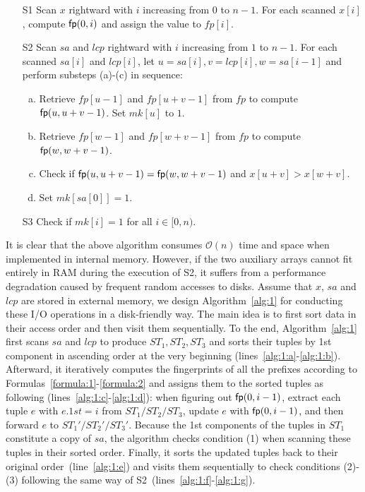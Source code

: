 \documentclass[10pt,journal,compsoc]{IEEEtran}
\begin{document}
\begin{enumerate}
	\item [S1]
	Scan $x$ rightward with $i$ increasing from $0$ to $n - 1$. For each scanned $x[i]$, compute ${\sf fp}(0, i)$ and assign the value to $fp[i]$.
	
	\item [S2]
	Scan $sa$ and $lcp$ rightward with $i$ increasing from $1$ to $n - 1$. For each scanned $sa[i]$ and $lcp[i]$, let $u = sa[i], v = lcp[i], w = sa[i - 1]$ and perform substeps (a)-(c) in sequence:
	
	\begin{enumerate}[(a)]
		\item
		Retrieve $fp[u - 1]$ and $fp[u + v - 1]$ from $fp$ to compute ${\sf fp}(u, u + v - 1)$. Set $mk[u]$ to $1$.
		
		\item
		Retrieve $fp[w - 1]$ and $fp[w + v - 1]$ from $fp$ to compute ${\sf fp}(w, w + v - 1)$.
		
		\item
		Check if ${\sf fp}(u, u + v - 1) = {\sf fp}(w, w + v - 1)$ and $x[u + v] > x[w + v]$.
		
		\item
		Set $mk[sa[0]] = 1$.
	\end{enumerate}

	\item [S3] Check if $mk[i] = 1$ for all $i \in [0, n)$.
	
\end{enumerate}

It is clear that the above algorithm consumes $\mathcal{O}(n)$ time and space when implemented in internal memory. However, if the two auxiliary arrays cannot fit entirely in RAM during the execution of S2, it suffers from a performance degradation caused by frequent random accesses to disks. Assume that $x$, $sa$ and $lcp$ are stored in external memory, we design Algorithm~\ref{alg:1} for conducting these I/O operations in a disk-friendly way. The main idea is to first sort data in their access order and then visit them sequentially. To the end, Algorithm~\ref{alg:1} first scans $sa$ and $lcp$ to produce $ST_1, ST_2, ST_3$ and sorts their tuples by 1st component in ascending order at the very beginning (lines~\ref{alg:1:a}-\ref{alg:1:b}). Afterward, it iteratively computes the fingerprints of all the prefixes according to Formulas~\ref{formula:1}-\ref{formula:2} and assigns them to the sorted tuples as following (lines~\ref{alg:1:c}-\ref{alg:1:d}): when figuring out ${\sf fp}(0, i - 1)$, extract each tuple $e$ with $e.1st = i$ from $ST_1/ST_2/ST_3$, update $e$  with ${\sf fp}(0, i - 1)$, and then forward $e$ to $ST_1'/ST_2'/ST_3'$. Because the 1st components of the tuples in $ST_1$ constitute a copy of $sa$, the algorithm checks condition (1) when scanning these tuples in their sorted order. Finally, it sorts the updated tuples back to their original order~(line~\ref{alg:1:e}) and visits them  sequentially to check conditions (2)-(3) following the same way of S2~(lines~\ref{alg:1:f}-\ref{alg:1:g}).  
\end{document}
